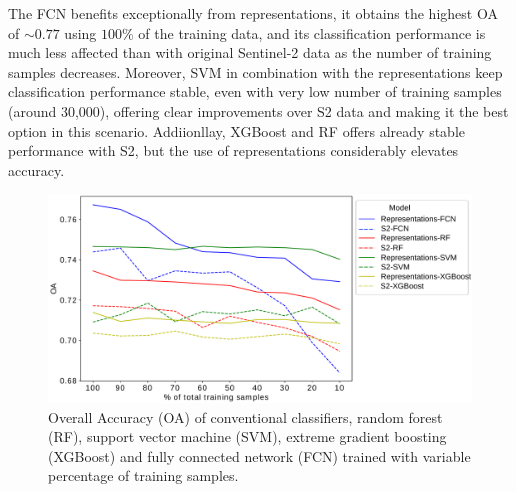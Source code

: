\documentclass[journal,article,submit,pdftex,moreauthors]{Definitions/mdpi}
\begin{document}
The FCN benefits exceptionally from representations, it obtains the highest \ac{OA} of $\sim 0.77$ using $100 \%$ of the training data, and its classification performance is much less affected than with original Sentinel-2 data as the number of training samples decreases. 
Moreover, SVM in combination with the representations keep classification performance stable, even with very low number of training samples (around 30,000), offering clear improvements over S2 data and making it the best option in this scenario. Addiionllay, XGBoost and RF offers already stable performance with S2, but the use of representations considerably elevates accuracy.


\begin{figure}[H]
	\centering
	\includegraphics[width=\textwidth]{figures/oa_vs_train_pct_corrected-2.pdf}
	\caption{Overall Accuracy (OA) of conventional classifiers, random forest (RF), support vector machine (SVM), extreme gradient boosting (XGBoost) and fully connected network (FCN) trained with variable percentage of training samples.}
	\label{oa_vs_train_pct}    
\end{figure}
\end{document}
